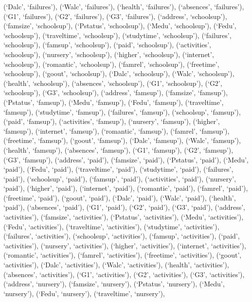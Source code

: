 \documentclass[
]{article}
\begin{document}
(`Dalc', `failures'), (`Walc', `failures'), (`health', `failures'),
(`absences', `failures'), (`G1', `failures'), (`G2', `failures'), (`G3',
`failures'), (`address', `schoolsup'), (`famsize', `schoolsup'),
(`Pstatus', `schoolsup'), (`Medu', `schoolsup'), (`Fedu', `schoolsup'),
(`traveltime', `schoolsup'), (`studytime', `schoolsup'), (`failures',
`schoolsup'), (`famsup', `schoolsup'), (`paid', `schoolsup'),
(`activities', `schoolsup'), (`nursery', `schoolsup'), (`higher',
`schoolsup'), (`internet', `schoolsup'), (`romantic', `schoolsup'),
(`famrel', `schoolsup'), (`freetime', `schoolsup'), (`goout',
`schoolsup'), (`Dalc', `schoolsup'), (`Walc', `schoolsup'), (`health',
`schoolsup'), (`absences', `schoolsup'), (`G1', `schoolsup'), (`G2',
`schoolsup'), (`G3', `schoolsup'), (`address', `famsup'), (`famsize',
`famsup'), (`Pstatus', `famsup'), (`Medu', `famsup'), (`Fedu',
`famsup'), (`traveltime', `famsup'), (`studytime', `famsup'),
(`failures', `famsup'), (`schoolsup', `famsup'), (`paid', `famsup'),
(`activities', `famsup'), (`nursery', `famsup'), (`higher', `famsup'),
(`internet', `famsup'), (`romantic', `famsup'), (`famrel', `famsup'),
(`freetime', `famsup'), (`goout', `famsup'), (`Dalc', `famsup'),
(`Walc', `famsup'), (`health', `famsup'), (`absences', `famsup'), (`G1',
`famsup'), (`G2', `famsup'), (`G3', `famsup'), (`address', `paid'),
(`famsize', `paid'), (`Pstatus', `paid'), (`Medu', `paid'), (`Fedu',
`paid'), (`traveltime', `paid'), (`studytime', `paid'), (`failures',
`paid'), (`schoolsup', `paid'), (`famsup', `paid'), (`activities',
`paid'), (`nursery', `paid'), (`higher', `paid'), (`internet', `paid'),
(`romantic', `paid'), (`famrel', `paid'), (`freetime', `paid'),
(`goout', `paid'), (`Dalc', `paid'), (`Walc', `paid'), (`health',
`paid'), (`absences', `paid'), (`G1', `paid'), (`G2', `paid'), (`G3',
`paid'), (`address', `activities'), (`famsize', `activities'),
(`Pstatus', `activities'), (`Medu', `activities'), (`Fedu',
`activities'), (`traveltime', `activities'), (`studytime',
`activities'), (`failures', `activities'), (`schoolsup', `activities'),
(`famsup', `activities'), (`paid', `activities'), (`nursery',
`activities'), (`higher', `activities'), (`internet', `activities'),
(`romantic', `activities'), (`famrel', `activities'), (`freetime',
`activities'), (`goout', `activities'), (`Dalc', `activities'), (`Walc',
`activities'), (`health', `activities'), (`absences', `activities'),
(`G1', `activities'), (`G2', `activities'), (`G3', `activities'),
(`address', `nursery'), (`famsize', `nursery'), (`Pstatus', `nursery'),
(`Medu', `nursery'), (`Fedu', `nursery'), (`traveltime', `nursery'),
\end{document}
